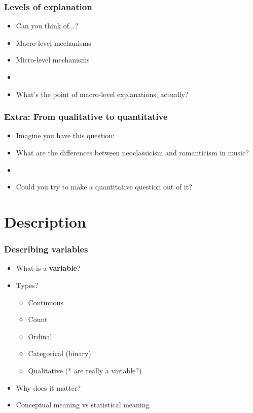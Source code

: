 \documentclass[aspectratio=43]{beamer}
\begin{document}
\begin{frame}
\frametitle{Levels of explanation}
\centering

\begin{itemize}
\item[] Can you think of...?
\item Macro-level mechanisms
\item Micro-level mechanisms
\item[]
\item<2-> What's the point of macro-level explanations, actually?
\end{itemize}

\end{frame}

\begin{frame}
\frametitle{Extra: From qualitative to quantitative}
\centering

\begin{itemize}
  \item Imagine you have this question:
  \item[] What are the differences between neoclassicism and romanticism in music?
  \item[]
  \item Could you try to make a quantitative question out of it?
\end{itemize}

\end{frame}

\section{Description}

\begin{frame}
\frametitle{Describing variables}
\centering

\begin{itemize}
  \item What is a \textbf{variable}?
  \item Types?
  \begin{itemize}
    \item<2-> Continuous
    \item<3-> Count
    \item<4-> Ordinal
    \item<5-> Categorical (binary)
    \item<6-> Qualitative (* are really a variable?)
  \end{itemize}
  \item<7-> Why does it matter?
  \item<7-> Conceptual meaning vs statistical meaning
\end{itemize}

\end{frame}
\end{document}

